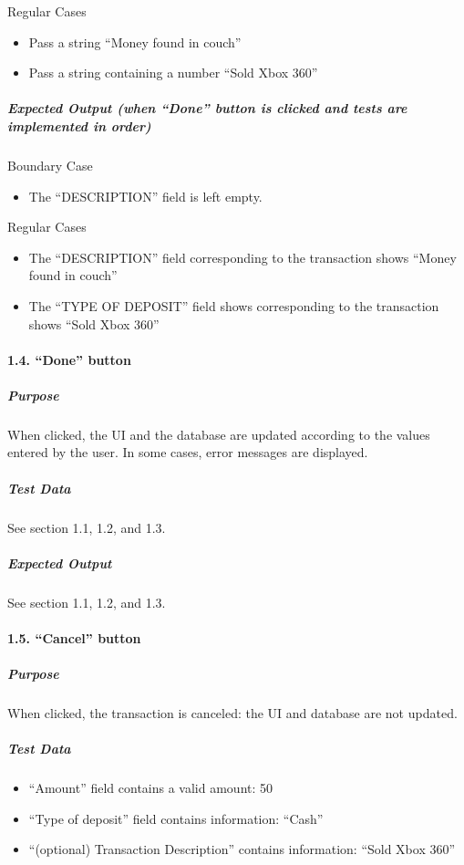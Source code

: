 \documentclass[12pt]{article}
\begin{document}
Regular Cases
\begin{itemize}
  \item Pass a string ``Money found in couch''
  \item Pass a string containing a number ``Sold Xbox 360''
 \end{itemize}
 
\subparagraph{Expected Output (when ``Done'' button is clicked and tests are implemented in order)}
 
Boundary Case
\begin{itemize}
  \item The ``DESCRIPTION'' field is left empty. 
\end{itemize}

Regular Cases
\begin{itemize}
  \item The ``DESCRIPTION'' field corresponding to the transaction shows ``Money found in couch'' 
  \item The ``TYPE OF DEPOSIT'' field shows corresponding to the transaction shows ``Sold Xbox 360''
 \end{itemize}

\paragraph{1.4. ``Done'' button}

\subparagraph{Purpose} When clicked, the UI and the database are updated according to the values entered by the user. In some cases, error messages are displayed.
 
\subparagraph{Test Data} See section 1.1, 1.2, and 1.3.
 
\subparagraph{Expected Output}
See section 1.1, 1.2, and 1.3.
 
\paragraph{1.5. ``Cancel'' button}
 
\subparagraph{Purpose} When clicked, the transaction is canceled: the UI and database are not updated.
 
\subparagraph{Test Data}
\begin{itemize}
  \item ``Amount'' field contains a valid amount: 50
  \item ``Type of deposit'' field contains information: ``Cash''
  \item ``(optional) Transaction Description'' contains information: ``Sold Xbox 360''
 \end{itemize}
\end{document}
